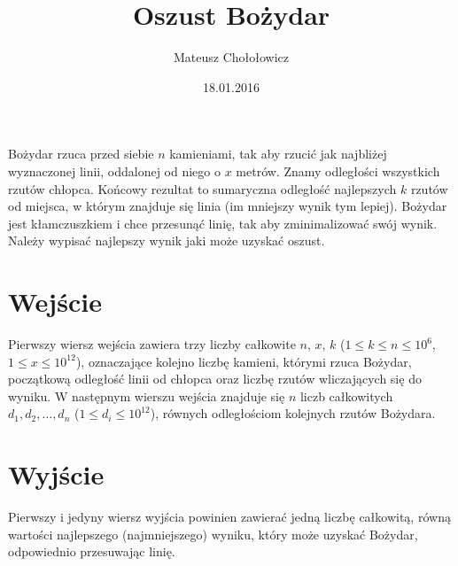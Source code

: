 \documentclass[zad,zawodnik,utf8]{sinol}
\title{Oszust Bożydar}
\author{Mateusz Chołołowicz} %
\date{18.01.2016}
\begin{document}
  \begin{tasktext}%
Bożydar rzuca przed siebie $n$ kamieniami, tak aby rzucić jak najbliżej wyznaczonej linii, oddalonej od niego
o $x$ metrów. Znamy odległości wszystkich rzutów chłopca.
Końcowy rezultat to sumaryczna odległość najlepszych $k$ rzutów od miejsca, w którym znajduje się linia 
(im mniejszy wynik tym lepiej). Bożydar jest kłamczuszkiem i chce przesunąć linię, tak aby zminimalizować 
swój wynik. Należy wypisać najlepszy wynik jaki może uzyskać oszust.

 \section{Wejście}
	
Pierwszy wiersz wejścia zawiera trzy liczby całkowite $n$, $x$, $k$ ($1 \leq k \leq n \leq 10^6$, 
$1 \leq x \leq 10^{12}$), oznaczające kolejno liczbę kamieni, którymi rzuca Bożydar, początkową odległość linii
od chłopca oraz liczbę rzutów wliczających się do wyniku. W następnym wierszu wejścia znajduje się $n$ liczb 
całkowitych $d_1, d_2, \ldots, d_n$ ($1 \leq d_i \leq 10^{12}$), równych odległościom kolejnych rzutów Bożydara.

  \section{Wyjście}
	Pierwszy i jedyny wiersz wyjścia powinien zawierać jedną liczbę całkowitą, równą wartości najlepszego
	(najmniejszego) wyniku, który może uzyskać Bożydar, odpowiednio przesuwając linię.

     \makecompactexample

  \end{tasktext}
\end{document}
